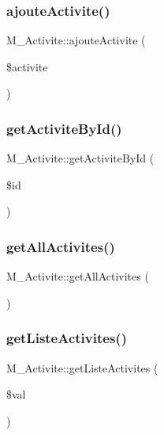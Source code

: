 \subsubsection{\texorpdfstring{ajoute\+Activite()}{ajouteActivite()}}
{\footnotesize\ttfamily M\+\_\+\+Activite\+::ajoute\+Activite (\begin{DoxyParamCaption}\item[{}]{\$activite }\end{DoxyParamCaption})}

\mbox{\label{class_m___activite_ade611581b7f071fe2e9aa80b02fa816c}} 
\subsubsection{\texorpdfstring{get\+Activite\+By\+Id()}{getActiviteById()}}
{\footnotesize\ttfamily M\+\_\+\+Activite\+::get\+Activite\+By\+Id (\begin{DoxyParamCaption}\item[{}]{\$id }\end{DoxyParamCaption})}

\mbox{\label{class_m___activite_ab048497e24a4b97c4c06744136f9c191}} 
\subsubsection{\texorpdfstring{get\+All\+Activites()}{getAllActivites()}}
{\footnotesize\ttfamily M\+\_\+\+Activite\+::get\+All\+Activites (\begin{DoxyParamCaption}{ }\end{DoxyParamCaption})}

\mbox{\label{class_m___activite_a50c113f3a0a372c0d18c8aa020ac723d}} 
\subsubsection{\texorpdfstring{get\+Liste\+Activites()}{getListeActivites()}}
{\footnotesize\ttfamily M\+\_\+\+Activite\+::get\+Liste\+Activites (\begin{DoxyParamCaption}\item[{}]{\$val }\end{DoxyParamCaption})}

